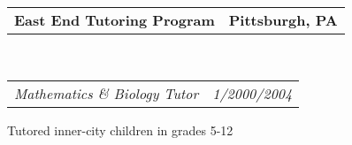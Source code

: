 \documentclass[12pt,letterpaper,oneside]{article}
\makeatletter
\newcommand{\headerrow}[2]
{\begin{tabular*}{\linewidth}{l@{\extracolsep{\fill}}r}
	#1 &
	#2 \\
\end{tabular*}}
\makeatother
\begin{document}
\begin{itemize}
	\headerrow
		{\textbf{East End Tutoring Program}}
		{\textbf{Pittsburgh, PA}}
	\\
	\headerrow
		{\emph{Mathematics \& Biology Tutor}}
		{\emph{1/2000\textendash 5/2004}}
	\vspace{-6mm}
\end{itemize}
\end{document}
